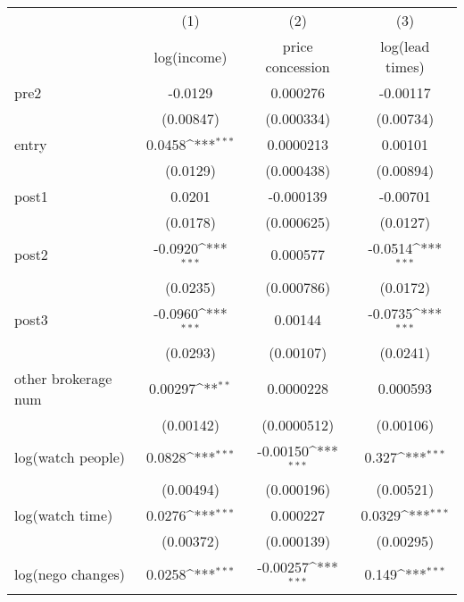 {
\def\sym#1{\ifmmode^{#1}\else\(^{#1}\)\fi}
\begin{tabular}{l*{3}{c}}
\toprule
            &\multicolumn{1}{c}{(1)}&\multicolumn{1}{c}{(2)}&\multicolumn{1}{c}{(3)}\\
            &\multicolumn{1}{c}{log(income)}&\multicolumn{1}{c}{price concession}&\multicolumn{1}{c}{log(lead times)}\\
\midrule
pre2        &     -0.0129         &    0.000276         &    -0.00117         \\
            &   (0.00847)         &  (0.000334)         &   (0.00734)         \\
\addlinespace
entry       &      0.0458\sym{***}&   0.0000213         &     0.00101         \\
            &    (0.0129)         &  (0.000438)         &   (0.00894)         \\
\addlinespace
post1       &      0.0201         &   -0.000139         &    -0.00701         \\
            &    (0.0178)         &  (0.000625)         &    (0.0127)         \\
\addlinespace
post2       &     -0.0920\sym{***}&    0.000577         &     -0.0514\sym{***}\\
            &    (0.0235)         &  (0.000786)         &    (0.0172)         \\
\addlinespace
post3       &     -0.0960\sym{***}&     0.00144         &     -0.0735\sym{***}\\
            &    (0.0293)         &   (0.00107)         &    (0.0241)         \\
\addlinespace
other brokerage num  &     0.00297\sym{**} &   0.0000228         &    0.000593         \\
            &   (0.00142)         & (0.0000512)         &   (0.00106)         \\
\addlinespace
log(watch people)&      0.0828\sym{***}&    -0.00150\sym{***}&       0.327\sym{***}\\
            &   (0.00494)         &  (0.000196)         &   (0.00521)         \\
\addlinespace
log(watch time)&      0.0276\sym{***}&    0.000227         &      0.0329\sym{***}\\
            &   (0.00372)         &  (0.000139)         &   (0.00295)         \\
\addlinespace
log(nego changes)&      0.0258\sym{***}&    -0.00257\sym{***}&       0.149\sym{***}\\

\end{tabular}}
